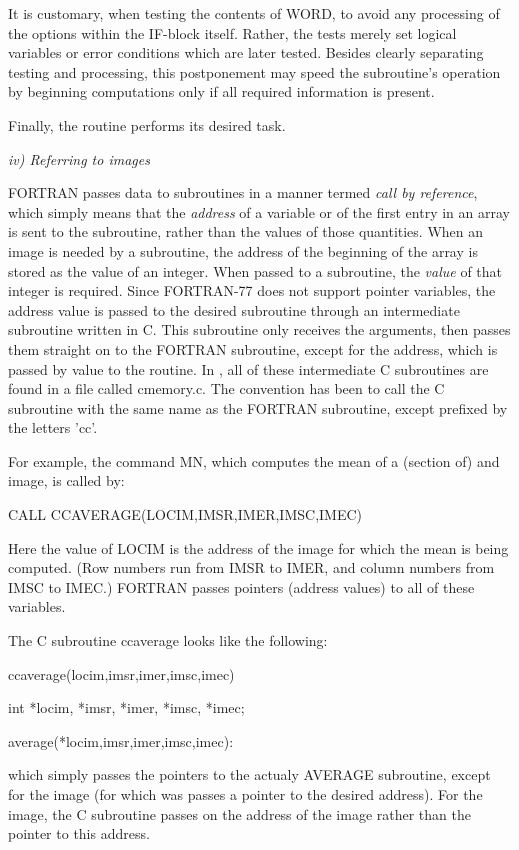 	It is customary, when testing the contents of WORD, to avoid
any processing of the options within the IF-block itself. Rather, the
tests merely set logical variables or error conditions which are later
tested.  Besides clearly separating testing and processing, this
postponement may speed the subroutine's operation by beginning
computations only if all required information is present. 

	Finally, the routine performs its desired task.

\Sskip
\centerline {\it iv)  Referring to images}

	FORTRAN passes data to subroutines in a manner termed {\it call
by reference}, which simply means that the {\it address} of a
variable or of the first entry in an array is sent to the subroutine,
rather than the values of those quantities. When an image is needed by
a subroutine, the address of the beginning of the array is stored as
the value of an integer. When passed to a subroutine, the {\it value}
of that integer is required.  Since FORTRAN-77 does not support pointer
variables, the address value is passed to the desired subroutine through
an intermediate subroutine written in C. This subroutine only receives the
arguments, then passes them straight on to the FORTRAN subroutine, except
for the address, which is passed by value to the routine. In \V, all of 
these intermediate C subroutines are found in a file called cmemory.c.
The convention has been to call the C subroutine with the same name as
the FORTRAN subroutine, except prefixed by the letters 'cc'.

For example, the command MN, which computes the mean of a (section of)
and image, is called by:

\vskip 0.15in
	CALL CCAVERAGE(LOCIM,IMSR,IMER,IMSC,IMEC)

\vskip 0.15in
Here the value of LOCIM is the address of the image
for which the mean is being computed.  (Row numbers run from IMSR
to IMER, and column numbers from IMSC to IMEC.) FORTRAN passes pointers
(address values) to all of these variables.

The C subroutine ccaverage looks like the following:

ccaverage(locim,imsr,imer,imsc,imec)

int *locim, *imsr, *imer, *imsc, *imec;

{

  average(*locim,imsr,imer,imsc,imec):

}

which simply passes the pointers to the actualy AVERAGE subroutine,
except for the image (for which was passes a pointer to the desired address).
For the image, the C subroutine passes on the address of the image 
rather than the pointer to this address.


